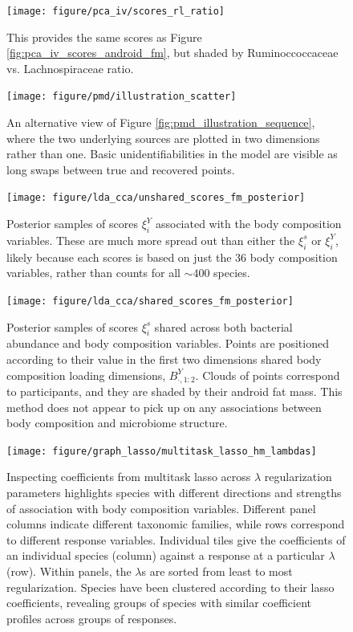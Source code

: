 \documentclass{article}
\begin{document}
\begin{figure}
  \centering
  \texttt{[image: figure/pca\_iv/scores\_rl\_ratio]}
  \caption{This provides the same scores as Figure
    \ref{fig:pca_iv_scores_android_fm}, but shaded by Ruminoccoccaceae vs.
    Lachnospiraceae ratio. \label{fig:pca_iv_scores_rl_ratio} }
\end{figure}

\begin{figure}
  \centering
  \texttt{[image: figure/pmd/illustration\_scatter]}
  \caption{An alternative view of Figure \ref{fig:pmd_illustration_sequence},
    where the two underlying sources are plotted in two dimensions rather than
    one. Basic unidentifiabilities in the model are visible as long swaps
    between true and recovered points. \label{fig:pmd_illustration_scatter} }
\end{figure}

 \begin{figure}
   \centering
   \texttt{[image: figure/lda\_cca/unshared\_scores\_fm\_posterior]}
   \caption{Posterior samples of scores $\xi^{Y}_i$ associated with the body
     composition variables. These are much more spread out than either the
     $\xi_{i}^s$ or $\xi_{i}^Y$, likely because each scores is based on just the
     36 body composition variables, rather than counts for all $\sim 400$
     species.
     \label{fig:lda_cca_unshared_scores_fm_posterior} }
 \end{figure}

 \begin{figure}
   \centering
   \texttt{[image: figure/lda\_cca/shared\_scores\_fm\_posterior]}
   \caption{Posterior samples of scores $\xi^{s}_i$ shared across both bacterial
     abundance and body composition variables. Points are positioned according
     to their value in the first two dimensions shared body composition loading
     dimensions, $B^{Y}_{\cdot, 1:2}$. Clouds of points correspond to
     participants, and they are shaded by their android fat mass. This method
     does not appear to pick up on any associations between body composition and
     microbiome structure.
 \label{fig:lda_cca_shared_scores_fm_posterior} }
 \end{figure}

\begin{figure}
  \centering
  \texttt{[image: figure/graph\_lasso/multitask\_lasso\_hm\_lambdas]}
  \caption{ Inspecting coefficients from multitask lasso across $\lambda$
    regularization parameters highlights species with different directions and
    strengths of association with body composition variables. Different panel
    columns indicate different taxonomic families, while rows correspond to
    different response variables. Individual tiles give the coefficients of an
    individual species (column) against a response at a particular $\lambda$
    (row). Within panels, the $\lambda$s are sorted from least to most
    regularization. Species have been clustered according to their lasso
    coefficients, revealing groups of species with similar coefficient profiles
    across groups of responses.
    \label{fig:graph_lasso_multitask_lasso_hm_lambdas} }
\end{figure}
\end{document}
